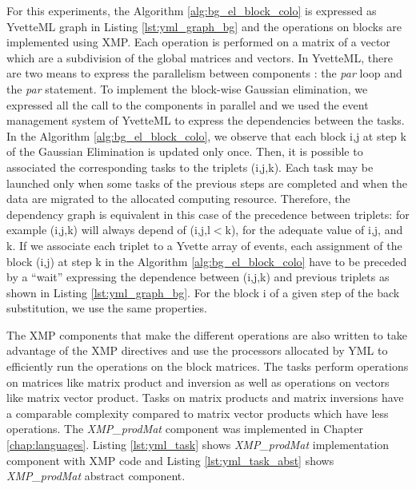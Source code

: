 For this experiments, the Algorithm \ref{alg:bg_el_block_colo} is expressed as YvetteML graph in Listing \ref{lst:yml_graph_bg} and the operations on blocks are implemented using XMP.
Each operation is performed on a matrix of a vector which are a subdivision of the global matrices and vectors.
In YvetteML, there are two means to express the parallelism between components : the \textit{par} loop and the \textit{par} statement.
To implement the block-wise Gaussian elimination, we expressed all the call to the components in parallel and we used the event management system of YvetteML to express the dependencies between the tasks.
In the Algorithm \ref{alg:bg_el_block_colo}, we observe that each block i,j at step k of the Gaussian Elimination is updated only once.
Then, it is possible to associated the corresponding tasks to the triplets (i,j,k).
Each task may be launched only when some tasks of the previous steps are completed and when the data are migrated to the allocated computing resource.
Therefore, the dependency graph is equivalent in this case of the precedence between triplets: for example (i,j,k) will always depend of (i,j,l$<$k), for the adequate value of i,j, and k.
If we associate each triplet to a Yvette array of events, each assignment of the block (i,j) at step k in the Algorithm \ref{alg:bg_el_block_colo} have to be preceded by a “wait” expressing the dependence between (i,j,k) and previous triplets as shown in Listing \ref{lst:yml_graph_bg}.
For the block i of a given step  of the back substitution, we use the same properties.



The XMP components that make the different operations are also written to take advantage of the XMP directives and use the processors allocated by YML to efficiently run the operations on the block matrices.
The tasks perform operations on matrices like matrix product and inversion as well as operations on vectors like matrix vector product.
Tasks on matrix products and matrix inversions have a comparable complexity compared to matrix vector products which have less operations.
The \textit{XMP\_prodMat} component was implemented in Chapter \ref{chap:languages}.
Listing \ref{lst:yml_task} shows \textit{XMP\_prodMat} implementation component with XMP code and Listing \ref{lst:yml_task_abst} shows \textit{XMP\_prodMat} abstract component.

